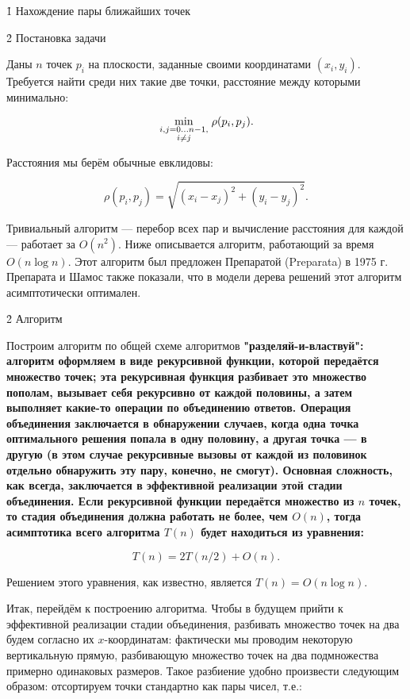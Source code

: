\h1{ Нахождение пары ближайших точек }


\h2{ Постановка задачи }

Даны $n$ точек $p_i$ на плоскости, заданные своими координатами $(x_i,y_i)$. Требуется найти среди них такие две точки, расстояние между которыми минимально:

$$ \min_{\scriptstyle i,j=0 \ldots n-1, \atop \scriptstyle i \ne j} \rho (p_i,p_j). $$

Расстояния мы берём обычные евклидовы:

$$ \rho(p_i,p_j) = \sqrt{ (x_i-x_j)^2 + (y_i-y_j)^2 }. $$

Тривиальный алгоритм --- перебор всех пар и вычисление расстояния для каждой --- работает за $O(n^2)$. Ниже описывается алгоритм, работающий за время $O(n \log n)$. Этот алгоритм был предложен Препаратой (Preparata) в 1975 г. Препарата и Шамос также показали, что в модели дерева решений этот алгоритм асимптотически оптимален.


\h2{ Алгоритм }

Построим алгоритм по общей схеме алгоритмов \bf{"разделяй-и-властвуй"}: алгоритм оформляем в виде рекурсивной функции, которой передаётся множество точек; эта рекурсивная функция разбивает это множество пополам, вызывает себя рекурсивно от каждой половины, а затем выполняет какие-то операции по объединению ответов. Операция объединения заключается в обнаружении случаев, когда одна точка оптимального решения попала в одну половину, а другая точка --- в другую (в этом случае рекурсивные вызовы от каждой из половинок отдельно обнаружить эту пару, конечно, не смогут). Основная сложность, как всегда, заключается в эффективной реализации этой стадии объединения. Если рекурсивной функции передаётся множество из $n$ точек, то стадия объединения должна работать не более, чем $O(n)$, тогда асимптотика всего алгоритма $T(n)$ будет находиться из уравнения:

$$ T(n) = 2 T(n/2) + O(n). $$

Решением этого уравнения, как известно, является $T(n) = O (n \log n)$.

Итак, перейдём к построению алгоритма. Чтобы в будущем прийти к эффективной реализации стадии объединения, разбивать множество точек на два будем согласно их $x$-координатам: фактически мы проводим некоторую вертикальную прямую, разбивающую множество точек на два подмножества примерно одинаковых размеров. Такое разбиение удобно произвести следующим образом: отсортируем точки стандартно как пары чисел, т.е.:

